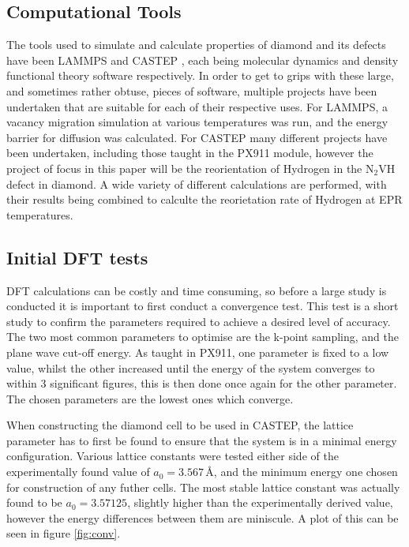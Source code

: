 \documentclass[10pt,a4paper,twocolumn,twoside]{extarticle}
\begin{document}
\subsection{Computational Tools}
The tools used to simulate and calculate properties of diamond and its defects have been LAMMPS \cite{LAMMPS} and CASTEP \cite{CASTEP}, each being molecular dynamics and density functional theory software respectively. In order to get to grips with these large, and sometimes rather obtuse, pieces of software, multiple projects have been undertaken that are suitable for each of their respective uses. For LAMMPS, a vacancy migration simulation at various temperatures was run, and the energy barrier for diffusion was calculated. For CASTEP many different projects have been undertaken, including those taught in the PX911 module, however the project of focus in this paper will be the reorientation of Hydrogen in the N$_2$VH defect in diamond. A wide variety of different calculations are performed, with their results being combined to calculte the reorietation rate of Hydrogen at EPR temperatures. 

\subsection{Initial DFT tests}
DFT calculations can be costly and time consuming, so before a large study is conducted it is important to first conduct a convergence test. This test is a short study to confirm the parameters required to achieve a desired level of accuracy. The two most common parameters to optimise are the k-point sampling, and the plane wave cut-off energy. As taught in PX911, one parameter is fixed to a low value, whilst the other increased until the energy of the system converges to within 3 significant figures, this is then done once again for the other parameter. The chosen parameters are the lowest ones which converge. 

When constructing the diamond cell to be used in CASTEP, the lattice parameter has to first be found to ensure that the system is in a minimal energy configuration. Various lattice constants were tested either side of the experimentally found value of $a_0 = 3.567$\,{\AA}, and the minimum energy one chosen for construction of any futher cells. The most stable lattice constant was actually found to be $a_0 = 3.57125$, slightly higher than the experimentally derived value, however the energy differences between them are miniscule. A plot of this can be seen in figure \ref{fig:conv}.
\end{document}
